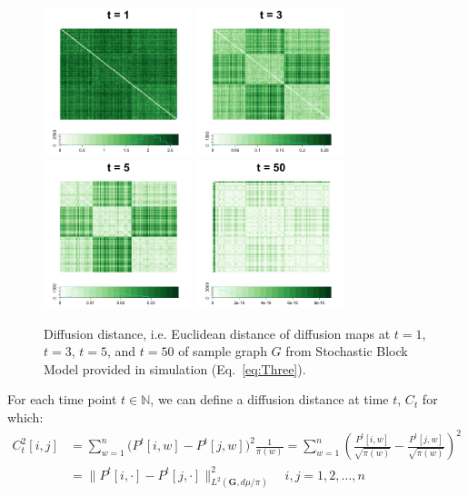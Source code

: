 \documentclass[12pt]{article}
\theoremstyle{definition}
\begin{document}
\begin{figure}[H]
	\centering
	\includegraphics[width=1.7in]{../Figure/Dx1.png}
	\includegraphics[width=1.7in]{../Figure/Dx3.png}
	\includegraphics[width=1.7in]{../Figure/Dx5.png}
	\includegraphics[width=1.7in]{../Figure/Dx50.png}
	\caption{Diffusion distance, i.e. Euclidean distance of diffusion maps at $t=1$, $t=3$, $t=5$, and $t=50$ of sample graph $G$ from Stochastic Block Model provided in simulation (Eq.~\ref{eq:Three}).}
	\label{fig:diffusions}
\end{figure}	
For each time point $t \in \mathbb{N}$, we can define a diffusion distance at time $t$, $C_{t}$ for which:	
\begin{equation}
\label{eq:diffusion}
\begin{split}
C^2_{t}[i,j] & = \sum\limits_{w =1}^{n} \big( P^{t}[i,w] - P^{t}[j,w]  \big)^{2} \frac{1}{\pi(w)} = \sum\limits_{w=1}^{n} \left(  \frac{P^{t}[i,w]}{\sqrt{\pi(w)}} - \frac{P^{t}[j,w]}{\sqrt{\pi(w)}}   \right)^2 \\ & = \parallel P^{t}[i, \cdot] - P^{t}[j, \cdot]  \parallel^2_{L^{2}(\mathbf{G}, d\mu / \pi)  } \quad i,j = 1,2, \ldots , n
\end{split}
\end{equation}
\end{document}
